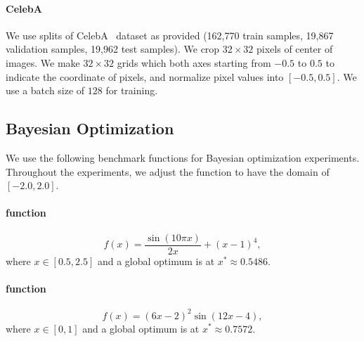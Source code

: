 \paragraph{CelebA}
We use splits of CelebA~\citep{liu2015faceattributes} dataset as provided (162,770 train samples, 19,867 validation samples, 19,962 test samples). We crop $32 \times 32$ pixels of center of images. We make $32 \times 32$ grids which both axes starting from $-0.5$ to $0.5$ to indicate the coordinate of pixels, and normalize pixel values into $[-0.5, 0.5]$. We use a batch size of $128$ for training.


\subsection{Bayesian Optimization}
\label{app:sec:details:bo}

We use the following benchmark functions for Bayesian optimization experiments. Throughout the experiments, we adjust the function to  have the domain of $[-2.0, 2.0]$.
\paragraph{\citet{gramacy2012cases} function}
\[
f(x)=\frac{\sin(10\pi x)}{2x} + (x-1)^4,
\]
where $x\in [0.5,2.5]$ and a global optimum is at $x^\ast\approx 0.5486$.
\paragraph{\citet{sobester2008engineering} function}
\[
f(x)=(6x-2)^2\sin (12x-4),
\]
where $x\in [0,1]$ and a global optimum is at $x^\ast\approx0.7572$.

